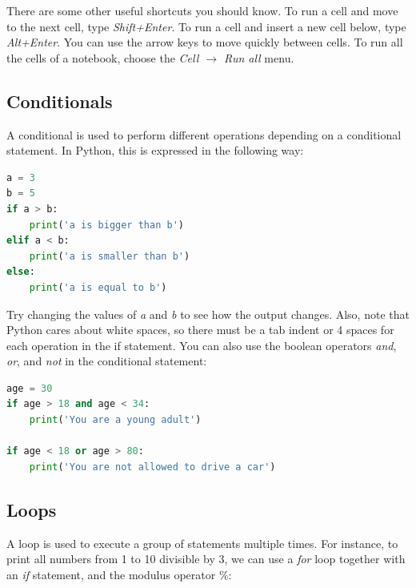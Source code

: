 \documentclass[a4paper , 12pt]{book}
\begin{document}
There are some other useful shortcuts you should know. To run a cell and move to the next cell, type \textit{Shift+Enter}. To run a cell and insert a new cell below, type \textit{Alt+Enter}. You can use the arrow keys to move quickly between cells. To run all the cells of a notebook, choose the \textit{Cell $\rightarrow$ Run all} menu.

\subsection{Conditionals}

A conditional is used to perform different operations depending on a conditional statement. In Python, this is expressed in the following way:

\begin{center}
\begin{lstlisting}[language=Python, frame=single]
a = 3
b = 5
if a > b:
    print('a is bigger than b')
elif a < b:    
    print('a is smaller than b')
else:
    print('a is equal to b')
\end{lstlisting}
\end{center}

Try changing the values of \textit{a} and \textit{b} to see how the output changes. Also, note that Python cares about white spaces, so there must be a tab indent or 4 spaces for each operation in the if statement. You can also use the boolean operators \textit{and}, \textit{or}, and \textit{not} in the conditional statement:

\begin{center}
\begin{lstlisting}[language=Python, frame=single]
age = 30
if age > 18 and age < 34:
    print('You are a young adult')

if age < 18 or age > 80:
    print('You are not allowed to drive a car')
\end{lstlisting}
\end{center}

\subsection{Loops}

A loop is used to execute a group of statements multiple times. For instance, to print all numbers from 1 to 10 divisible by 3, we can use a \textit{for} loop together with an \textit{if} statement, and the modulus operator $\%$:
\end{document}
